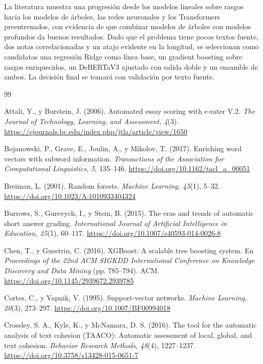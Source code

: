 \documentclass[11pt,a4paper]{article}
\begin{document}
La literatura muestra una progresión desde los modelos lineales sobre rasgos hacia los modelos de árboles, las redes neuronales y los Transformers preentrenados, con evidencia de que combinar modelos de árboles con modelos profundos da buenos resultados. Dado que el problema tiene pocos textos fuente, dos notas correlacionadas y un atajo evidente en la longitud, se seleccionan como candidatos una regresión Ridge como línea base, un gradient boosting sobre rasgos enriquecidos, un DeBERTaV3 ajustado con salida doble y un ensamble de ambos. La decisión final se tomará con validación por texto fuente.

\begin{thebibliography}{99}

Attali, Y., y Burstein, J. (2006). Automated essay scoring with e-rater V.2. \textit{The Journal of Technology, Learning, and Assessment, 4}(3). \url{https://ejournals.bc.edu/index.php/jtla/article/view/1650}

Bojanowski, P., Grave, E., Joulin, A., y Mikolov, T. (2017). Enriching word vectors with subword information. \textit{Transactions of the Association for Computational Linguistics, 5}, 135--146. \url{https://doi.org/10.1162/tacl_a_00051}

Breiman, L. (2001). Random forests. \textit{Machine Learning, 45}(1), 5--32. \url{https://doi.org/10.1023/A:1010933404324}

Burrows, S., Gurevych, I., y Stein, B. (2015). The eras and trends of automatic short answer grading. \textit{International Journal of Artificial Intelligence in Education, 25}(1), 60--117. \url{https://doi.org/10.1007/s40593-014-0026-8}

Chen, T., y Guestrin, C. (2016). XGBoost: A scalable tree boosting system. En \textit{Proceedings of the 22nd ACM SIGKDD International Conference on Knowledge Discovery and Data Mining} (pp. 785--794). ACM. \url{https://doi.org/10.1145/2939672.2939785}

Cortes, C., y Vapnik, V. (1995). Support-vector networks. \textit{Machine Learning, 20}(3), 273--297. \url{https://doi.org/10.1007/BF00994018}

Crossley, S. A., Kyle, K., y McNamara, D. S. (2016). The tool for the automatic analysis of text cohesion (TAACO): Automatic assessment of local, global, and text cohesion. \textit{Behavior Research Methods, 48}(4), 1227--1237. \url{https://doi.org/10.3758/s13428-015-0651-7}


\end{thebibliography}
\end{document}
